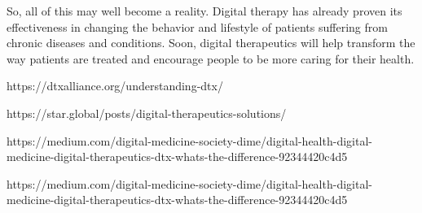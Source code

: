 \documentclass[15pt]{article}
\begin{document}
So, all of this may well become a reality. Digital therapy has already proven its effectiveness in changing the behavior and lifestyle of patients suffering from chronic diseases and conditions. Soon, digital therapeutics will help transform the way patients are treated and encourage people to be more caring for their health.

https://dtxalliance.org/understanding-dtx/

https://star.global/posts/digital-therapeutics-solutions/

https://medium.com/digital-medicine-society-dime/digital-health-digital-medicine-digital-therapeutics-dtx-whats-the-difference-92344420c4d5

https://medium.com/digital-medicine-society-dime/digital-health-digital-medicine-digital-therapeutics-dtx-whats-the-difference-92344420c4d5
\end{document}

